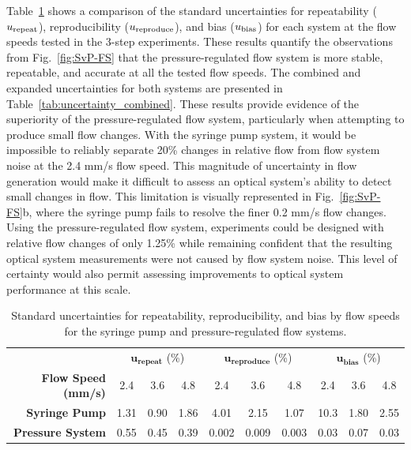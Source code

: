 \documentclass[12pt]{spieman}
\begin{document}
\begin{spacing}{2}
Table~\ref{tab:uncertainty_standard} shows a comparison of the standard uncertainties for repeatability ($u_\textnormal{repeat}$), reproducibility ($u_\textnormal{reproduce}$), and bias ($u_\textnormal{bias}$) for each system at the flow speeds tested in the 3-step experiments. These results quantify the observations from Fig.~\ref{fig:SvP-FS} that the pressure-regulated flow system is more stable, repeatable, and accurate at all the tested flow speeds. The combined and expanded uncertainties for both systems are presented in Table~\ref{tab:uncertainty_combined}. These results provide evidence of the superiority of the pressure-regulated flow system, particularly when attempting to produce small flow changes. With the syringe pump system, it would be impossible to reliably separate 20\% changes in relative flow from flow system noise at the 2.4 mm/s flow speed. This magnitude of uncertainty in flow generation would make it difficult to assess an optical system's ability to detect small changes in flow. This limitation is visually represented in Fig.~\ref{fig:SvP-FS}b, where the syringe pump fails to resolve the finer 0.2 mm/s flow changes. Using the pressure-regulated flow system, experiments could be designed with relative flow changes of only 1.25\% while remaining confident that the resulting optical system measurements were not caused by flow system noise. This level of certainty would also permit assessing improvements to optical system performance at this scale.

\begin{table}
    \caption {
        Standard uncertainties for repeatability, reproducibility, and bias by flow speeds for the syringe pump and pressure-regulated flow systems.
    }
    \label{tab:uncertainty_standard}
    \centering
    \begin{tabular}{rccccccccc}
        \addlinespace
        \toprule
            &
            \multicolumn{3}{c}{$\boldsymbol{u_\textbf{repeat}}$ (\%)}       & 
            \multicolumn{3}{c}{$\boldsymbol{u_\textbf{reproduce}}$ (\%)}    & 
            \multicolumn{3}{c}{$\boldsymbol{u_\textbf{bias}}$ (\%)}         \\
            \cmidrule(lr){2-4}
            \cmidrule(lr){5-7}
            \cmidrule(lr){8-10}
        \textbf{Flow Speed (mm/s)} & 2.4    & 3.6   & 4.8   & 2.4   & 3.6   & 4.8   & 2.4   & 3.6   & 4.8   \\
        \midrule
        \textbf{Syringe Pump}      & 1.31   & 0.90  & 1.86  & 4.01  & 2.15  & 1.07  & 10.3  & 1.80  & 2.55  \\
        \textbf{Pressure System}   & 0.55   & 0.45  & 0.39  & 0.002 & 0.009 & 0.003 & 0.03  & 0.07  & 0.03  \\
        \bottomrule
    \end{tabular}
\end{table}


\end{spacing}
\end{document}
